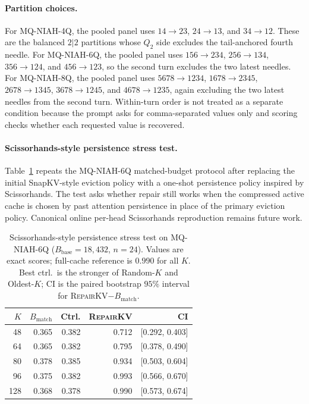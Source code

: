 \documentclass{article}
\newcommand{\repairkv}{\textsc{RepairKV}}
\newcommand{\bbase}{\ensuremath{B_{\mathrm{base}}}}
\newcommand{\bmatch}{\ensuremath{B_{\mathrm{match}}}}
\begin{document}
\paragraph{Partition choices.}
For MQ-NIAH-4Q, the pooled panel uses
$14{\rightarrow}23$, $24{\rightarrow}13$, and
$34{\rightarrow}12$.
These are the balanced $2|2$ partitions whose $Q_2$ side excludes the
tail-anchored fourth needle.
For MQ-NIAH-6Q, the pooled panel uses
$156{\rightarrow}234$, $256{\rightarrow}134$,
$356{\rightarrow}124$, and $456{\rightarrow}123$, so the second turn
excludes the two latest needles.
For MQ-NIAH-8Q, the pooled panel uses
$5678{\rightarrow}1234$, $1678{\rightarrow}2345$,
$2678{\rightarrow}1345$, $3678{\rightarrow}1245$, and
$4678{\rightarrow}1235$, again excluding the two latest needles from the
second turn.
Within-turn order is not treated as a separate condition because the
prompt asks for comma-separated values only and scoring checks whether
each requested value is recovered.

\paragraph{Scissorhands-style persistence stress test.}
Table~\ref{tab:app-scissorhands-stress} repeats the MQ-NIAH-6Q
matched-budget protocol after replacing the initial SnapKV-style eviction policy with a
one-shot persistence policy inspired by Scissorhands.
The test asks whether repair still works when the compressed active cache
is chosen by past attention persistence in place of the primary eviction
policy.
Canonical online per-head Scissorhands reproduction remains future work.

\begin{table}[H]
  \centering
  \caption{Scissorhands-style persistence stress test on
  MQ-NIAH-6Q ($\bbase{=}18{,}432$, $n{=}24$). Values are exact scores;
  full-cache reference is $0.990$ for all $K$. Best ctrl.\ is the stronger
  of Random-$K$ and Oldest-$K$; CI is the paired bootstrap $95\%$
  interval for \repairkv{}$-\bmatch$.}
  \label{tab:app-scissorhands-stress}
  \small
  \setlength{\tabcolsep}{3.5pt}
  \begin{tabular}{rrrrr}
    \toprule
    $K$ & $\bmatch$ & Ctrl. & \repairkv{} & CI \\
    \midrule
    48 & 0.365 & 0.382 & 0.712 & [0.292, 0.403] \\
    64 & 0.365 & 0.382 & 0.795 & [0.378, 0.490] \\
    80 & 0.378 & 0.385 & 0.934 & [0.503, 0.604] \\
    96 & 0.375 & 0.382 & 0.993 & [0.566, 0.670] \\
    128 & 0.368 & 0.378 & 0.990 & [0.573, 0.674] \\
    \bottomrule
  \end{tabular}
\end{table}
\end{document}
